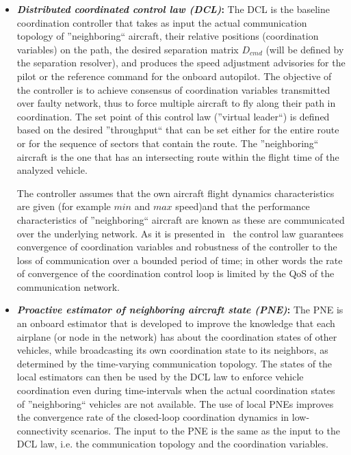 \documentclass[letter,onecolumn,12pt]{aiaa-tc}
\newcommand{\1}{1_n}
\begin{document}
\begin{itemize}
\setlength{\itemsep}{-1pt}
\vspace{-2mm}

\item \textbf{\emph{Distributed coordinated control law (DCL)}:} The DCL is the baseline coordination controller that takes as input the actual communication topology of ''neighboring`` aircraft, their relative positions (coordination variables) on the path, the desired separation matrix $D_{cmd}$ (will be defined by the separation resolver),  and produces the speed adjustment advisories for the pilot or the reference command for the onboard autopilot. The objective of the controller is to achieve consensus of coordination variables transmitted over faulty network, thus to force multiple aircraft to fly along their path in coordination. The set point of this control law (''virtual leader``) is defined based on the desired ''throughput`` that can be set either for the entire route or for the sequence of sectors that contain the route.  The ''neighboring`` aircraft is the one that has an intersecting route within the flight time of the analyzed vehicle.

The controller assumes that the own aircraft flight dynamics characteristics are given (for example $min$ and $max$ speed)and that the performance characteristics of ''neighboring`` aircraft are known as these are communicated over the underlying network. As it is presented in~\cite{CSM12_CPF} the control law guarantees convergence of coordination variables and robustness of the controller to the loss of communication over a bounded period of time; in other words the rate of convergence of the coordination control loop is limited by the QoS of the communication network.

\item \textbf{\emph{Proactive  estimator of neighboring aircraft state (PNE)}:} The PNE is an onboard estimator that is developed to improve the knowledge that each airplane (or node in the network) has about the coordination states of other vehicles, while  broadcasting its own coordination state to its neighbors, as determined by the time-varying communication topology. The states of the local estimators can then be used by the DCL law to enforce vehicle coordination even during time-intervals when the actual coordination states of ''neighboring`` vehicles are not available. The use of local PNEs improves the convergence rate of the closed-loop coordination dynamics in low-connectivity scenarios. The input to the PNE is the same as the input to the DCL law, i.e. the communication topology and the coordination variables.


\end{itemize}
\end{document}
